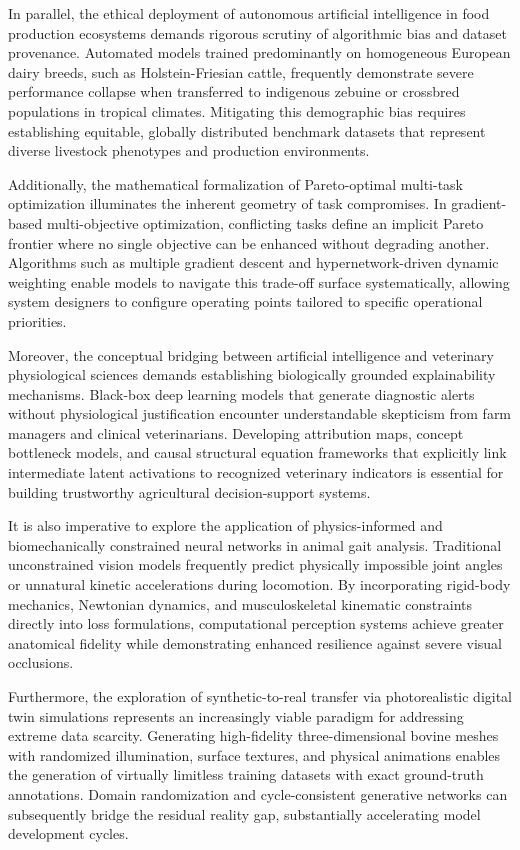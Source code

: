 \documentclass[Times,12pt,oneside,openany,print,index]{report}
\begin{document}
In parallel, the ethical deployment of autonomous artificial intelligence in food production ecosystems demands rigorous scrutiny of algorithmic bias and dataset provenance. Automated models trained predominantly on homogeneous European dairy breeds, such as Holstein-Friesian cattle, frequently demonstrate severe performance collapse when transferred to indigenous zebuine or crossbred populations in tropical climates. Mitigating this demographic bias requires establishing equitable, globally distributed benchmark datasets that represent diverse livestock phenotypes and production environments.

Additionally, the mathematical formalization of Pareto-optimal multi-task optimization illuminates the inherent geometry of task compromises. In gradient-based multi-objective optimization, conflicting tasks define an implicit Pareto frontier where no single objective can be enhanced without degrading another. Algorithms such as multiple gradient descent and hypernetwork-driven dynamic weighting enable models to navigate this trade-off surface systematically, allowing system designers to configure operating points tailored to specific operational priorities.

Moreover, the conceptual bridging between artificial intelligence and veterinary physiological sciences demands establishing biologically grounded explainability mechanisms. Black-box deep learning models that generate diagnostic alerts without physiological justification encounter understandable skepticism from farm managers and clinical veterinarians. Developing attribution maps, concept bottleneck models, and causal structural equation frameworks that explicitly link intermediate latent activations to recognized veterinary indicators is essential for building trustworthy agricultural decision-support systems.

It is also imperative to explore the application of physics-informed and biomechanically constrained neural networks in animal gait analysis. Traditional unconstrained vision models frequently predict physically impossible joint angles or unnatural kinetic accelerations during locomotion. By incorporating rigid-body mechanics, Newtonian dynamics, and musculoskeletal kinematic constraints directly into loss formulations, computational perception systems achieve greater anatomical fidelity while demonstrating enhanced resilience against severe visual occlusions.

Furthermore, the exploration of synthetic-to-real transfer via photorealistic digital twin simulations represents an increasingly viable paradigm for addressing extreme data scarcity. Generating high-fidelity three-dimensional bovine meshes with randomized illumination, surface textures, and physical animations enables the generation of virtually limitless training datasets with exact ground-truth annotations. Domain randomization and cycle-consistent generative networks can subsequently bridge the residual reality gap, substantially accelerating model development cycles.
\end{document}
